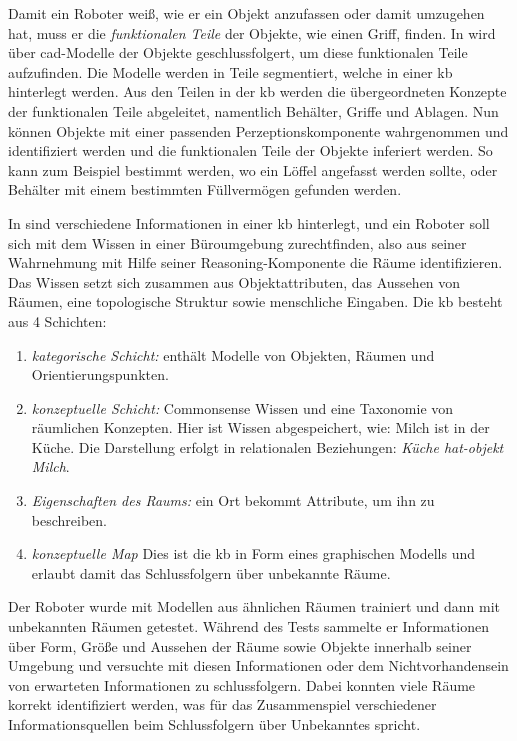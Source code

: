 Damit ein Roboter weiß, wie er ein Objekt anzufassen oder damit umzugehen hat, muss er die \textit{funktionalen Teile} der Objekte, wie einen Griff, finden. In \cite{reasoningFuncParts} wird über \gls{cad}-Modelle der Objekte geschlussfolgert, um diese funktionalen Teile aufzufinden. Die Modelle werden in Teile segmentiert, welche in einer \gls{kb} hinterlegt werden. Aus den Teilen in der \gls{kb} werden die übergeordneten Konzepte der funktionalen Teile abgeleitet, namentlich Behälter, Griffe und Ablagen. Nun können Objekte mit einer passenden Perzeptionskomponente wahrgenommen und identifiziert werden und die funktionalen Teile der Objekte inferiert werden. So kann zum Beispiel bestimmt werden, wo ein Löffel angefasst werden sollte, oder Behälter mit einem bestimmten Füllvermögen gefunden werden. \par

In \cite{pronobis1} sind verschiedene Informationen in einer \gls{kb} hinterlegt, und ein Roboter soll sich mit dem Wissen in einer Büroumgebung zurechtfinden, also aus seiner Wahrnehmung mit Hilfe seiner Reasoning-Komponente die Räume identifizieren. Das Wissen setzt sich zusammen aus Objektattributen, das Aussehen von Räumen, eine topologische Struktur sowie menschliche Eingaben. Die \gls{kb} besteht aus 4 Schichten: 
\begin{enumerate}
	\item \textit{kategorische Schicht:} enthält Modelle von Objekten, Räumen und Orientierungspunkten.
	\item \textit{konzeptuelle Schicht:} Commonsense Wissen und eine Taxonomie von räumlichen Konzepten. Hier ist Wissen abgespeichert, wie: Milch ist in der Küche. Die Darstellung erfolgt in relationalen Beziehungen: \textit{Küche hat-objekt Milch}.
	\item \textit{Eigenschaften des Raums:} ein Ort bekommt Attribute, um ihn zu beschreiben.
	\item \textit{konzeptuelle Map} Dies ist die \gls{kb} in Form eines graphischen Modells und erlaubt damit das Schlussfolgern über unbekannte Räume. 
\end{enumerate}
Der Roboter wurde mit Modellen aus ähnlichen Räumen trainiert und dann mit unbekannten Räumen getestet. Während des Tests sammelte er Informationen über Form, Größe und Aussehen der Räume sowie Objekte innerhalb seiner Umgebung und versuchte mit diesen Informationen oder dem Nichtvorhandensein von erwarteten Informationen zu schlussfolgern. Dabei konnten viele Räume korrekt identifiziert werden, was für das Zusammenspiel verschiedener Informationsquellen beim Schlussfolgern über Unbekanntes spricht. \par


